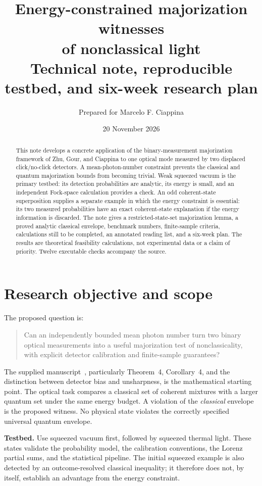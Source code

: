 \documentclass[11pt,a4paper]{article}
\title{Energy-constrained majorization witnesses\protect\\of nonclassical light\\[6pt]
\large Technical note, reproducible testbed, and six-week research plan}
\author{Prepared for Marcelo F. Ciappina}
\date{20 November 2026}
\begin{document}
\maketitle
\begin{abstract}
This note develops a concrete application of the binary-measurement majorization
framework of Zhu, Gour, and Ciappina to one optical mode measured by two displaced
click/no-click detectors. A mean-photon-number constraint prevents the classical
and quantum majorization bounds from becoming trivial. Weak squeezed vacuum is
the primary testbed: its detection probabilities are analytic, its energy is small,
and an independent Fock-space calculation provides a check. An odd coherent-state
superposition supplies a separate example in which the energy constraint is
essential: its two measured probabilities have an exact coherent-state explanation
if the energy information is discarded. The note gives a restricted-state-set
majorization lemma, a proved analytic classical envelope, benchmark numbers,
finite-sample criteria, calculations still to be completed, an annotated reading
list, and a six-week plan. The results are theoretical feasibility calculations,
not experimental data or a claim of priority. Twelve executable checks accompany
the source.
\end{abstract}

\section{Research objective and scope}
The proposed question is:
\begin{quote}
Can an independently bounded mean photon number turn two binary optical
measurements into a useful majorization test of nonclassicality, with explicit
detector calibration and finite-sample guarantees?
\end{quote}
The supplied manuscript~\cite{ZhuManuscript}, particularly Theorem~4,
Corollary~4, and the distinction between detector bias and unsharpness, is the
mathematical starting point. The optical task compares a classical set of coherent
mixtures with a larger quantum set under the same energy budget. A violation of
the \emph{classical} envelope is the proposed witness. No physical state violates
the correctly specified universal quantum envelope.

\textbf{Testbed.} Use squeezed vacuum first, followed by squeezed thermal light.
These states validate the probability model, the calibration conventions, the
Lorenz partial sums, and the statistical pipeline. The initial squeezed example
is also detected by an outcome-resolved classical inequality; it therefore does
not, by itself, establish an advantage from the energy constraint.
\end{document}
